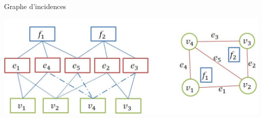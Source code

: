 \documentclass[aspectratio=169, 12pt, a4paper, hyperref={pdfauthor={Alexandre MARIN}, pdfkeywords={IFPEN, Delaunay, Voronoi, mesh generation}, colorlinks=true, linkcolor=purple, urlcolor=blue, citecolor=magenta}]{beamer}
\begin{document}
\begin{Energie}{Graphe d'incidences}
\begin{center}
\includegraphics[scale=0.65]{adjacencies.jpg}
\end{center}
\end{Energie}
\end{document}
